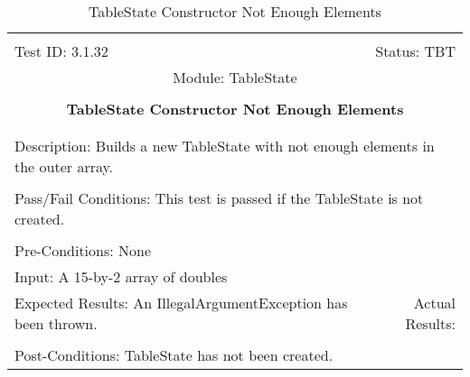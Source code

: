\documentclass[titlepage]{article}
\begin{document}
\begin{center}%
\begin{table}[h!]
\begin{tabular}{|l r|}\hline&\\[-2mm]
	Test ID: 3.1.32	&Status: TBT\\[-3mm]
	\multicolumn{2}{|c|}{Module: TableState}\\&\\
	\multicolumn{2}{|c|}{\textbf{\large{TableState Constructor Not Enough Elements}}}\\&\\\hline&\\[-3mm]
	\multicolumn{2}{|p{\textwidth}|}{Description: Builds a new TableState with not enough elements in the outer array.}\\[1mm]\hline&\\[-3mm]
	\multicolumn{2}{|p{\textwidth}|}{Pass/Fail Conditions: This test is passed if the TableState is not created.}\\[1mm]\hline&\\[-3mm]
	\multicolumn{2}{|p{\textwidth}|}{Pre-Conditions: None}\\[4mm]
	\multicolumn{2}{|p{\textwidth}|}{Input: A 15-by-2 array of doubles}\\[2mm]\hline
	\multicolumn{1}{|p{0.49\textwidth}}{Expected Results: An IllegalArgumentException has been thrown.}	&\multicolumn{1}{|p{0.45\textwidth}|}{Actual Results: }\\\hline&\\[-3mm]
	\multicolumn{2}{|p{\textwidth}|}{Post-Conditions: TableState has not been created.}\\\hline
\end{tabular}
\caption{TableState Constructor Not Enough Elements}
\end{table}
\end{center}
\end{document}
